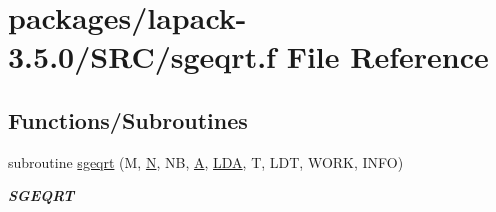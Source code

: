 \hypertarget{sgeqrt_8f}{}\section{packages/lapack-\/3.5.0/\+S\+R\+C/sgeqrt.f File Reference}
\label{sgeqrt_8f}
\subsection*{Functions/\+Subroutines}
\begin{DoxyCompactItemize}
\item 
subroutine \hyperlink{group__realGEcomputational_ga036c4a8fce2027da4ed92cf9064e8819}{sgeqrt} (M, \hyperlink{polmisc_8c_a0240ac851181b84ac374872dc5434ee4}{N}, N\+B, \hyperlink{classA}{A}, \hyperlink{example__user_8c_ae946da542ce0db94dced19b2ecefd1aa}{L\+D\+A}, T, L\+D\+T, W\+O\+R\+K, I\+N\+F\+O)
\begin{DoxyCompactList}\small\item\em {\bfseries S\+G\+E\+Q\+R\+T} \end{DoxyCompactList}\end{DoxyCompactItemize}
